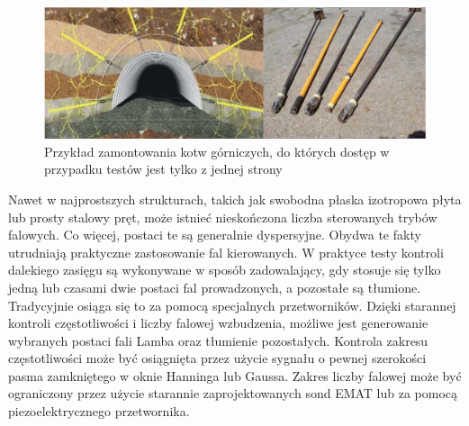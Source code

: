 \begin{figure}[h]
\centering
\includegraphics[width=14cm]{Zdjecia/4/kotwy}
\caption{Przykład zamontowania kotw górniczych, do których dostęp w przypadku testów jest tylko z jednej strony \cite{kotwy}}
\label{fig:kotwy}
\end{figure}

Nawet w najprostszych strukturach, takich jak swobodna płaska izotropowa płyta lub prosty stalowy pręt, może istnieć nieskończona liczba sterowanych trybów falowych. Co więcej, postaci te są generalnie dyspersyjne. Obydwa te fakty utrudniają praktyczne zastosowanie fal kierowanych. W praktyce testy kontroli dalekiego zasięgu są wykonywane w sposób zadowalający, gdy stosuje się tylko jedną lub czasami dwie postaci fal prowadzonych, a pozostałe są tłumione. Tradycyjnie osiąga się to za pomocą specjalnych przetworników. Dzięki starannej kontroli częstotliwości i liczby falowej wzbudzenia, możliwe jest generowanie wybranych postaci fali Lamba oraz tłumienie pozostałych. Kontrola zakresu częstotliwości może być osiągnięta przez użycie sygnału o pewnej szerokości pasma zamkniętego w oknie Hanninga lub Gaussa. Zakres liczby falowej może być ograniczony przez użycie starannie zaprojektowanych sond EMAT lub za pomocą piezoelektrycznego przetwornika. 

